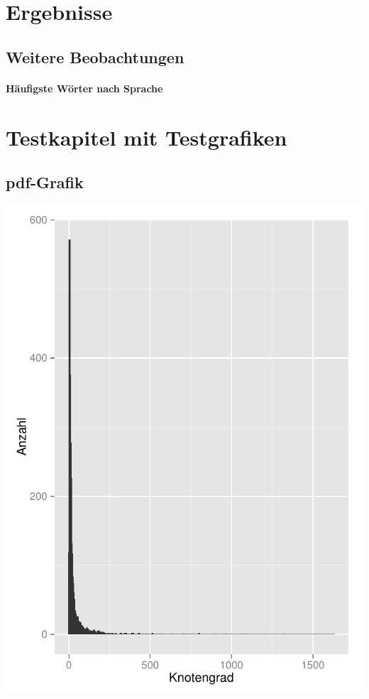 \documentclass[12pt, a4paper]{article}
\begin{document}
\section{Ergebnisse}
\subsection{Weitere Beobachtungen}
\paragraph{H\"aufigste W\"orter nach Sprache}

\section{Testkapitel mit Testgrafiken}

\subsection{pdf-Grafik}
\includegraphics{testplot.pdf}
\end{document}
